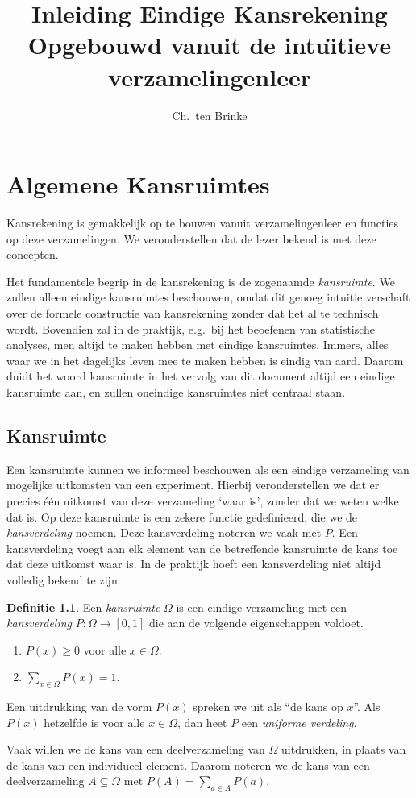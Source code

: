 \documentclass[a4paper]{book}
\title{Inleiding Eindige Kansrekening \\ \small{Opgebouwd vanuit de intu\"{\i}tieve verzamelingenleer}}
\author{Ch.\ ten Brinke}
\theoremstyle{definition}
\newtheorem{definition}[theorem]{Definitie}
\begin{document}
\maketitle

\chapter{Algemene Kansruimtes}
Kansrekening is gemakkelijk op te bouwen vanuit verzamelingenleer en functies op deze verzamelingen.
We veronderstellen dat de lezer bekend is met deze concepten.

Het fundamentele begrip in de kansrekening is de zogenaamde \emph{kansruimte}.
We zullen alleen eindige kansruimtes beschouwen, omdat dit genoeg intuitie verschaft over de formele constructie van kansrekening zonder dat het al te
technisch wordt.
Bovendien zal in de praktijk, e.g.\ bij het beoefenen van statistische analyses, men altijd te maken hebben met eindige kansruimtes.
Immers, alles waar we in het dagelijks leven mee te maken hebben is eindig van aard.
Daarom duidt het woord kansruimte in het vervolg van dit document altijd een eindige kansruimte aan, en zullen oneindige kansruimtes niet centraal
staan.


\section{Kansruimte}
Een kansruimte kunnen we informeel beschouwen als een eindige verzameling van mogelijke uitkomsten van een experiment.
Hierbij veronderstellen we dat er precies \'e\'en uitkomst van deze verzameling `waar is', zonder dat we weten welke dat is.
Op deze kansruimte is een zekere functie gedefinieerd, die we de \emph{kansverdeling} noemen.
Deze kansverdeling noteren we vaak met $P$.
Een kansverdeling voegt aan elk element van de betreffende kansruimte de kans toe dat deze uitkomst waar is.
In de praktijk hoeft een kansverdeling niet altijd volledig bekend te zijn.

\begin{definition}
    Een \emph{kansruimte} $\Omega$ is een eindige verzameling met een \emph{kansverdeling} $P: \Omega \to [0,1]$  die aan de volgende eigenschappen voldoet.
    \begin{enumerate}[i]
        \item $P(x) \geq 0$ voor alle $x \in \Omega$.
        \item $\sum_{x \in \Omega}P(x) = 1$.
    \end{enumerate}

    Een uitdrukking van de vorm $P(x)$ spreken we uit als ``de kans op $x$''.
    Als $P(x)$ hetzelfde is voor alle $x\in \Omega$, dan heet $P$ een \emph{uniforme verdeling}.

    Vaak willen we de kans van een deelverzameling van $\Omega$ uitdrukken, in plaats van de kans van een individueel element.
    Daarom noteren we de kans van een deelverzameling $A \subseteq \Omega$ met $P(A) = \sum_{a \in A} P(a)$.
\end{definition}
\end{document}
